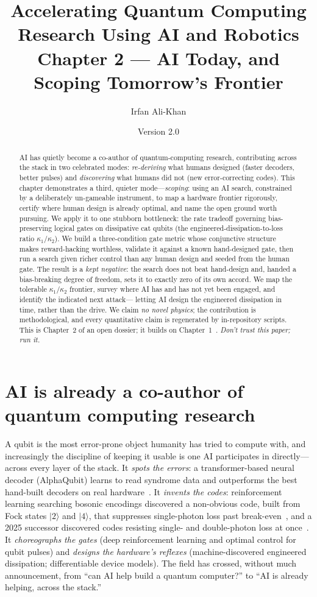 \documentclass[11pt]{article}
\title{Accelerating Quantum Computing Research Using AI and Robotics\\[2pt]
\large Chapter 2 --- AI Today, and Scoping Tomorrow's Frontier}
\author[1]{Irfan Ali-Khan}
\affil[1]{Independent Researcher \quad ORCID: 0009-0008-9685-8197}
\date{Version 2.0}
\begin{document}
\maketitle
\thispagestyle{fancy}

\begin{abstract}
\noindent AI has quietly become a co-author of quantum-computing research, contributing
across the stack in two celebrated modes: \emph{re-deriving} what humans designed (faster
decoders, better pulses) and \emph{discovering} what humans did not (new error-correcting
codes). This chapter demonstrates a third, quieter mode---\emph{scoping}: using an AI search,
constrained by a deliberately un-gameable instrument, to map a hardware frontier rigorously,
certify where human design is already optimal, and name the open ground worth pursuing. We
apply it to one stubborn bottleneck: the rate tradeoff governing bias-preserving logical gates
on dissipative cat qubits (the engineered-dissipation-to-loss ratio $\kappa_1/\kappa_2$). We
build a three-condition gate metric whose conjunctive structure makes reward-hacking
worthless, validate it against a known hand-designed gate, then run a search given richer
control than any human design and seeded from the human gate. The result is a \emph{kept
negative}: the search does not beat hand-design and, handed a bias-breaking degree of freedom,
sets it to exactly zero of its own accord. We map the tolerable $\kappa_1/\kappa_2$ frontier,
survey where AI has and has not yet been engaged, and identify the indicated next attack---%
letting AI design the engineered dissipation in time, rather than the drive. We claim
\emph{no novel physics}; the contribution is methodological, and every quantitative claim is
regenerated by in-repository scripts. This is Chapter~2 of an open dossier; it builds on
Chapter~1~\cite{chapter1}. \emph{Don't trust this paper; run it.}
\end{abstract}

\section{AI is already a co-author of quantum computing research}
A qubit is the most error-prone object humanity has tried to compute with, and increasingly
the discipline of keeping it usable is one AI participates in directly---across every layer of
the stack. It \emph{spots the errors}: a transformer-based neural decoder (AlphaQubit) learns
to read syndrome data and outperforms the best hand-built decoders on real
hardware~\cite{alphaqubit}. It \emph{invents the codes}: reinforcement learning searching
bosonic encodings discovered a non-obvious code, built from Fock states $\lvert 2\rangle$ and
$\lvert 4\rangle$, that suppresses single-photon loss past break-even~\cite{rlcode}, and a 2025
successor discovered codes resisting single- and double-photon loss at once~\cite{rlbos}. It
\emph{choreographs the gates} (deep reinforcement learning and optimal control for qubit
pulses) and \emph{designs the hardware's reflexes} (machine-discovered engineered dissipation;
differentiable device models). The field has crossed, without much announcement, from ``can AI
help build a quantum computer?'' to ``AI is already helping, across the stack.''
\end{document}
